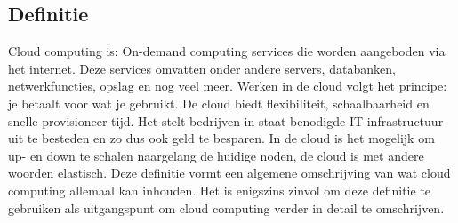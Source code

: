 \subsection{Definitie}

Cloud computing is:
\newline
On-demand computing services die worden aangeboden via het internet. Deze services omvatten onder andere servers, databanken, netwerkfuncties, opslag en nog veel meer. Werken in de cloud volgt het principe: je betaalt voor wat je gebruikt. De cloud biedt flexibiliteit, schaalbaarheid en snelle provisioneer tijd. Het stelt bedrijven in staat benodigde IT infrastructuur uit te besteden en zo dus ook geld te besparen. In de cloud is het mogelijk om up- en down te schalen naargelang de huidige noden, de cloud is met andere woorden elastisch. \autocite{Davis2017}
\newline
\newline
Deze definitie vormt een algemene omschrijving van wat cloud computing allemaal kan inhouden. Het is enigszins zinvol om deze definitie te gebruiken als uitgangspunt om cloud computing verder in detail te omschrijven.

